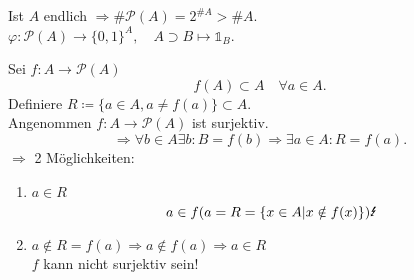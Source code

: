 \documentclass[../ana1.tex]{subfiles}
\begin{document}
\begin{bem}
	Ist \(A \) endlich \( \Rightarrow \# \mathcal{P} (A) = 2^{\# A} > \#A \). \\
	\( \varphi: \mathcal{P}(A) \rightarrow {\{0,1\}}^A, \quad A\supset B \mapsto \mathds{1}_B \).
\end{bem}
\begin{bew}
	Sei \(f: A \rightarrow \mathcal{P}(A) \)
	\[ f(A) \subset A \quad \forall a \in A. \]
	Definiere \(R \coloneqq \{a\in A, a \neq f(a)\} \subset A \). \\
	Angenommen \(f: A \rightarrow \mathcal{P}(A) \) ist surjektiv.
	\[ \Rightarrow \forall b\in A \exists b : B=f(b) \Rightarrow \exists a\in A : R = f(a). \]
	\(\Rightarrow \) 2 Möglichkeiten:
	\begin{enumerate}
		\item \(a\in R \) \[ a\in f(a = R = \{x\in A| x\notin f(x)\}) \text{\Lightning{}} \]
		\item \(a \notin R = f(a) \Rightarrow a \notin f(a) \Rightarrow a\in R \) \Lightning{} \\
		      \( f \) kann nicht surjektiv sein!
	\end{enumerate}
\end{bew}
\end{document}
